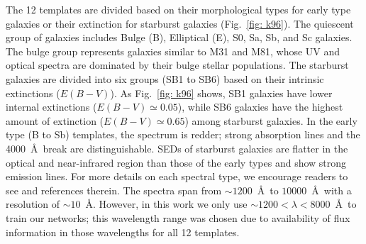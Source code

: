     The 12 templates are divided based on their morphological types for early type galaxies or their extinction for starburst galaxies (Fig.~\ref{fig: k96}). 
    The quiescent group of galaxies includes Bulge (B), Elliptical (E), S0, Sa, Sb, and Sc galaxies.
    The bulge group represents galaxies similar to M31 and M81, whose UV and optical spectra are dominated by their bulge stellar populations.
    The starburst galaxies are divided into six groups (SB1 to SB6) based on their intrinsic extinctions ($E(B-V)$). 
    As Fig.~\ref{fig: k96} shows, SB1 galaxies have lower internal extinctions ($E(B-V) \simeq 0.05$), while SB6 galaxies have the highest amount of extinction ($E(B-V) \simeq 0.65$) among starburst galaxies. 
    In the early type (B to Sb) templates, the spectrum is redder; strong absorption lines and the 4000~\AA~break are distinguishable.
    SEDs of starburst galaxies are flatter in the optical and near-infrared region than those of the early types and show strong emission lines.
    For more details on each spectral type, we encourage readers to see  and references therein. 
   The  spectra span from $\sim1200$~\AA~to $10000$~\AA~with a resolution of $\sim 10$~\AA.
    However, in this work we only use $\sim1200< \lambda < 8000$~\AA~to train our networks; 
    this wavelength range was chosen due to availability of flux information in those wavelengths for all 12 templates. 

